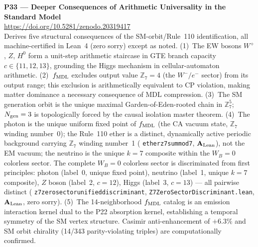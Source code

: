 \documentclass[11pt]{article}
\newcommand{\lean}[1]{%
  \penalty-100
  \begingroup\def\_{{\textunderscore\allowbreak}}\texttt{#1}\endgroup}
\newcommand{\CatAL}{\ensuremath{\textbf{A}_{\rm Lean}}}
\begin{document}
\medskip
\noindent\textbf{P33 — Deeper Consequences of Arithmetic Universality in the
Standard Model}~\cite{SpivackDeeperConsequences}\\
\url{https://doi.org/10.5281/zenodo.20319417}\\
Derives five structural consequences of the SM-orbit/Rule~110 identification,
all machine-certified in Lean~4 (zero sorry) except as noted.
(1)~The EW bosons $W^+$, $Z$, $H^0$ form a unit-step arithmetic staircase in
GTE branch capacity $c \in \{11, 12, 13\}$, grounding the Higgs mechanism in
cellular-automaton arithmetic.
(2)~$f_{\rm MDL}$ excludes output value $\mathbb{Z}_7 = 4$ (the $W^-/e^-$ sector)
from its output range; this exclusion is arithmetically equivalent to CP violation,
making matter dominance a necessary consequence of MDL compression.
(3)~The SM generation orbit is the unique maximal Garden-of-Eden-rooted chain in
$\mathbb{Z}_7^5$; $N_{\rm gen} = 3$ is topologically forced by the causal isolation
master theorem.
(4)~The photon is the unique uniform fixed point of $f_{\rm MDL}$ (the CA vacuum state,
$\mathbb{Z}_7$ winding number~0); the Rule~110 ether is a distinct, dynamically active
periodic background carrying $\mathbb{Z}_7$ winding number~1 (\lean{ether\_z7\_sum\_mod7},
$\CatAL$), not the EM vacuum;
the neutrino is the unique $k{=}7$ composite within the $W_B{=}0$ colorless sector.
The complete $W_B{=}0$ colorless sector is discriminated from first principles:
photon (label~0, unique fixed point), neutrino (label~1, unique $k{=}7$ composite),
$Z$ boson (label~2, $c{=}12$), Higgs (label~3, $c{=}13$) — all pairwise distinct
(\lean{z7\_zero\_sector\_unified\_discriminant}, \lean{Z7ZeroSectorDiscriminant.lean},
$\CatAL$, zero sorry).
(5)~The 14-neighborhood $f_{\rm MDL}$ catalog is an emission interaction kernel
dual to the P22 absorption kernel, establishing a temporal symmetry of the SM vertex
structure.  Casimir anti-enhancement of $+6.3\%$ and SM orbit chirality (14/343
parity-violating triples) are computationally confirmed.
\end{document}
